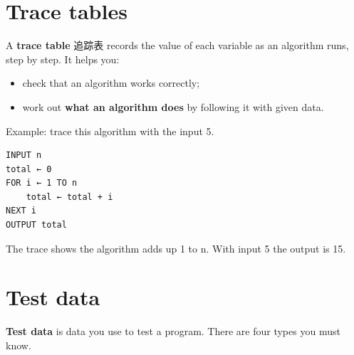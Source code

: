 \documentclass[11pt]{article}
\begin{document}
\section*{Trace tables}

A \textbf{trace table} 追踪表 records the value of each variable as an algorithm runs, step by step. It helps you:

\begin{itemize}
\item check that an algorithm works correctly;

\item work out \textbf{what an algorithm does} by following it with given data.

\end{itemize}

Example: trace this algorithm with the input 5.

\begin{Verbatim}
INPUT n
total ← 0
FOR i ← 1 TO n
    total ← total + i
NEXT i
OUTPUT total
\end{Verbatim}

\begin{center}
\end{center}

The trace shows the algorithm adds up 1 to n. With input 5 the output is 15.

\section*{Test data}

\textbf{Test data} is data you use to test a program. There are four types you must know.

\begin{center}
\end{center}
\end{document}
